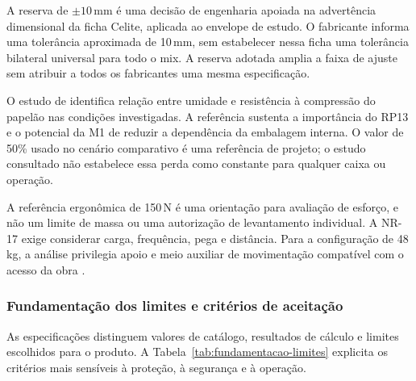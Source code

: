 A reserva de $\pm10$\,mm é uma decisão de engenharia apoiada na advertência dimensional da ficha Celite, aplicada ao envelope de estudo. O fabricante informa uma tolerância aproximada de 10\,mm, sem estabelecer nessa ficha uma tolerância bilateral universal para todo o mix. A reserva adotada amplia a faixa de ajuste sem atribuir a todos os fabricantes uma mesma especificação.

O estudo de \citet{brown2019} identifica relação entre umidade e resistência à compressão do papelão nas condições investigadas. A referência sustenta a importância do RP13 e o potencial da M1 de reduzir a dependência da embalagem interna. O valor de 50\% usado no cenário comparativo é uma referência de projeto; o estudo consultado não estabelece essa perda como constante para qualquer caixa ou operação.

A referência ergonômica de 150\,N é uma orientação para avaliação de esforço, e não um limite de massa ou uma autorização de levantamento individual. A NR-17 exige considerar carga, frequência, pega e distância. Para a configuração de 48\,kg, a análise privilegia apoio e meio auxiliar de movimentação compatível com o acesso da obra \citep{hsepushpull,nr17oficial}.

\subsubsection{Fundamentação dos limites e critérios de aceitação}

As especificações distinguem valores de catálogo, resultados de cálculo e limites escolhidos para o produto. A Tabela~\ref{tab:fundamentacao-limites} explicita os critérios mais sensíveis à proteção, à segurança e à operação.

